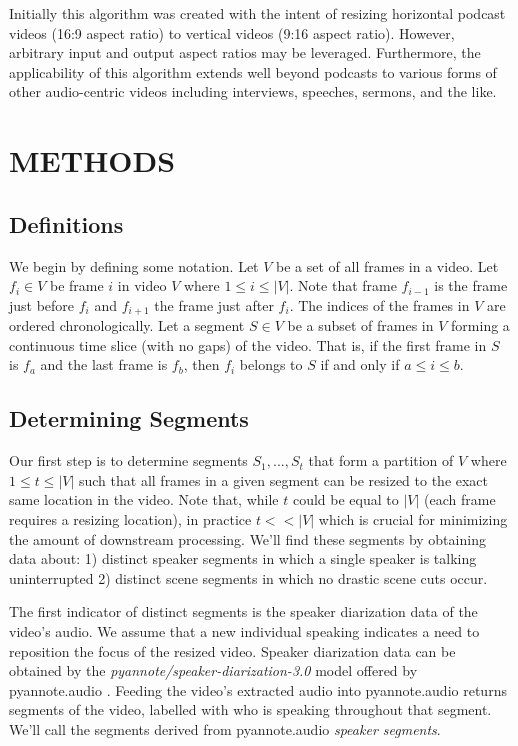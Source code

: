 \documentclass{article}
\begin{document}
Initially this algorithm was created with the intent of resizing horizontal podcast videos (16:9 aspect ratio) to vertical videos (9:16 aspect ratio). However, arbitrary input and output aspect ratios may be leveraged. Furthermore, the applicability of this algorithm extends well beyond podcasts to various forms of other audio-centric videos including interviews, speeches, sermons, and the like.

\section{METHODS}
\label{sec:pagestyle}

\subsection{Definitions}
We begin by defining some notation. Let $V$ be a set of all frames in a video. Let $f_i \in V$ be frame $i$ in video $V$ where $1 \le i \le |V|$. Note that frame $f_{i-1}$ is the frame just before $f_i$ and $f_{i+1}$ the frame just after $f_i$. The indices of the frames in $V$ are ordered chronologically. Let a segment $S \in V$ be a subset of frames in $V$ forming a continuous time slice (with no gaps) of the video. That is, if the first frame in $S$ is $f_a$ and the last frame is $f_b$, then $f_i$ belongs to $S$ if and only if $a \le i \le b$.

\subsection{Determining Segments}
\label{ssec:determining-segments}
Our first step is to determine segments $S_1, ..., S_t$ that form a partition of $V$ where $1 \le t \le |V|$ such that all frames in a given segment can be resized to the exact same location in the video. Note that, while $t$ could be equal to $|V|$ (each frame requires a resizing location), in practice $t << |V|$ which is crucial for minimizing the amount of downstream processing. We'll find these segments by obtaining data about: 1) distinct speaker segments in which a single speaker is talking uninterrupted 2) distinct scene segments in which no drastic scene cuts occur.

The first indicator of distinct segments is the speaker diarization data of the video's audio. We assume that a new individual speaking indicates a need to reposition the focus of the resized video. Speaker diarization data can be obtained by the \emph{pyannote/speaker-diarization-3.0} model offered by pyannote.audio \cite{Plaquet23} \cite{Bredin23}. Feeding the video's extracted audio into pyannote.audio returns segments of the video, labelled with who is speaking throughout that segment. We'll call the segments derived from pyannote.audio \emph{speaker segments}. 
\end{document}
